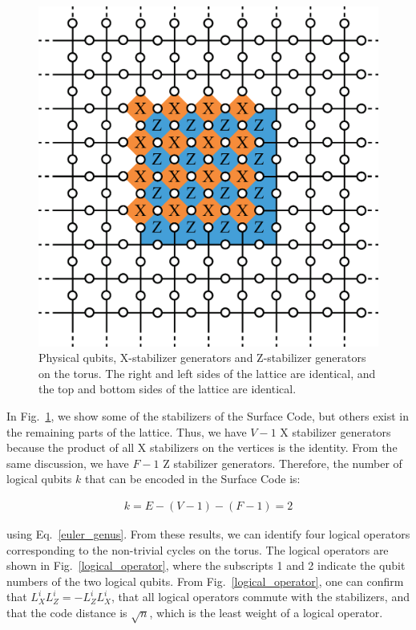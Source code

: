 \documentclass[a4paper,11pt]{ltjsarticle}
\begin{document}
{{        \begin{figure}[h]
            \centering
            \includegraphics[scale=0.40]{figure/local.eps}
            \vspace{0pt}\caption{Physical qubits, X-stabilizer generators and Z-stabilizer generators on the torus. The right and left sides of the lattice are identical, and the top and bottom sides of the lattice are identical.}
            \label{local}
        \end{figure}
    
        In Fig.~\ref{local}, we show some of the stabilizers of the Surface Code, but others exist in the remaining parts of the lattice. Thus, we have $V - 1$ X stabilizer generators because the product of all X stabilizers on the vertices is the identity. From the same discussion, we have $F - 1$ Z stabilizer generators. Therefore, the number of logical qubits $k$ that can be encoded in the Surface Code is:

    \begin{align}
        k = E - (V - 1) - (F - 1) = 2
    \end{align} 

    using Eq.~\ref{euler_genus}. From these results, we can identify four logical operators corresponding to the non-trivial cycles on the torus. The logical operators are shown in Fig.~\ref{logical_operator}, where the subscripts 1 and 2 indicate the qubit numbers of the two logical qubits. From Fig.~\ref{logical_operator}, one can confirm that $L^i_XL^i_Z = -L^i_ZL^i_X$, that all logical operators commute with the stabilizers, and that the code distance is $\sqrt{n}$, which is the least weight of a logical operator. 
    \clearpage

}}
\end{document}
